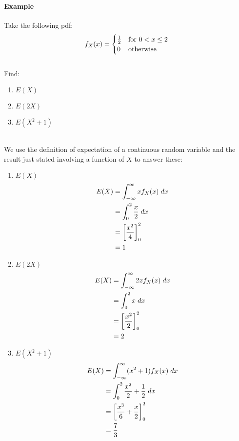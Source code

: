 \documentclass[,oneside]{article}
\begin{document}
\begin{enumerate}
\begin{align*}
\end{align*}\\
\textbf{Example}\\
\\Take the following pdf:
\[
f_X(x) =
\begin{cases}
\frac{1}{2} & \text{for } 0 < x \leq 2 \\
0 & $otherwise$
\end{cases} \] \\
Find:
\begin{enumerate}
\item $ E(X)$
\item $E(2X)$
\item $ E(X^2+1)$
\end{enumerate}\\
We use the definition of expectation of a continuous random variable and the result just stated involving a function of $X$ to answer these:\\
\begin{enumerate}
\item $E(X)$
\begin{align*}
E(X) &= \int_{-\infty}^{\infty} xf_X(x)\hspace{0.1cm}dx\\
&= \int_{0}^{2} \frac{x}{2}\hspace{0.1cm}dx\\
&= \left [ \frac{x^2}{4}\right]_{0}^{2}\\
&= 1
\end{align*}
\item $E(2X)$
\begin{align*}
E(X) &= \int_{-\infty}^{\infty} 2xf_X(x)\hspace{0.1cm}dx\\
&= \int_{0}^{2} x\hspace{0.1cm}dx\\
&= \left [ \frac{x^2}{2}\right]_{0}^{2}\\
&= 2
\end{align*}
\item $E(X^2+1)$
\begin{align*}
E(X) &= \int_{-\infty}^{\infty} (x^2+1)f_X(x)\hspace{0.1cm}dx\\
&= \int_{0}^{2} \frac{x^2}{2}+ \frac{1}{2}\hspace{0.1cm}dx\\
&= \left [ \frac{x^3}{6}+\frac{x}{2}\right]_{0}^{2}\\
&= \frac{7}{3}
\end{align*}\\

\end{enumerate}
\end{enumerate}
\end{document}
